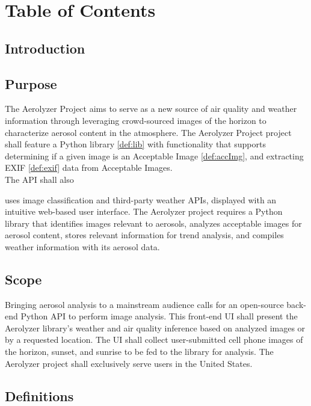 \documentclass[journal,10pt,draftclsnofoot,onecolumn]{IEEEtran}
\begin{document}
\section{Table of Contents}
\tableofcontents
\clearpage

\begin{singlespace}

\section{Introduction}

\subsection{Purpose}
	The Aerolyzer Project aims to serve as a new source of air quality and weather information through leveraging crowd-sourced images of the horizon to characterize aerosol content in the atmosphere.
	The Aerolyzer Project project shall feature a Python library \ref{def:lib} with functionality that supports determining if a given image is an Acceptable Image \ref{def:accImg}, and extracting EXIF \ref{def:exif} data from Acceptable Images.\\
	The API shall also 

	uses image classification and third-party weather APIs, displayed with an intuitive web-based user interface.
	The Aerolyzer project requires a Python library that identifies images relevant to aerosols, analyzes acceptable images for aerosol content, stores relevant information for trend analysis, and compiles weather information with its aerosol data. 

\subsection{Scope}
Bringing aerosol analysis to a mainstream audience calls for an open-source back-end Python API to perform image analysis.
This front-end UI shall present the Aerolyzer library's weather and air quality inference based on analyzed images or by a requested location.
The UI shall collect user-submitted cell phone images of the horizon, sunset, and sunrise to be fed to the library for analysis.
The Aerolyzer project shall exclusively serve users in the United States.

\subsection{Definitions}


\end{singlespace}
\end{document}
